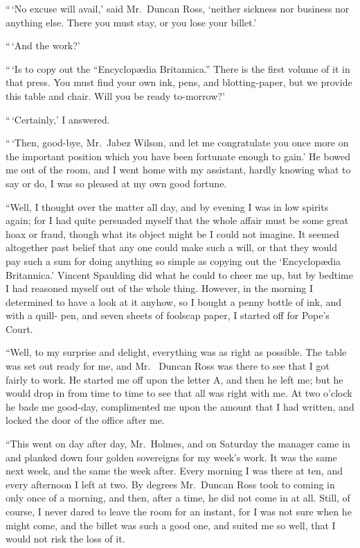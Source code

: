 “\,‘No excuse will avail,’ said Mr.~Duncan Ross, ‘neither
sickness nor business nor anything else. There you must
stay, or you lose your billet.’

“\,‘And the work?’

“\,‘Is to copy out the “Encyclopædia Britannica.” There
is the first volume of it in that press. You must find your
own ink, pens, and blotting-paper, but we provide this table
and chair. Will you be ready to-morrow?’

“\,‘Certainly,’ I answered.

“\,‘Then, good-bye, Mr.~Jabez Wilson, and let me congratulate
you once more on the important position which you
have been fortunate enough to gain.’ He bowed me out of
the room, and I went home with my assistant, hardly knowing
what to say or do, I was so pleased at my own good
fortune.

“Well, I thought over the matter all day, and by evening I
was in low spirits again; for I had quite persuaded myself
that the whole affair must be some great hoax or fraud,
though what its object might be I could not imagine. It
seemed altogether past belief that any one could make such
a will, or that they would pay such a sum for doing anything
so simple as copying out the ‘Encyclopædia Britannica.’
Vincent Spaulding did what he could to cheer me up, but by
bedtime I had reasoned myself out of the whole thing.
However, in the morning I determined to have a look at it
anyhow, so I bought a penny bottle of ink, and with a quill-%
pen, and seven sheets of foolscap paper, I started off for
Pope’s Court.

“Well, to my surprise and delight, everything was as right
as possible. The table was set out ready for me, and Mr.\ %
Duncan Ross was there to see that I got fairly to work. He
started me off upon the letter A, and then he left me; but he
would drop in from time to time to see that all was right with
me. At two o’clock he bade me good-day, complimented me
upon the amount that I had written, and locked the door of
the office after me.

“This went on day after day, Mr.~Holmes, and on Saturday
the manager came in and planked down four golden sovereigns
for my week’s work. It was the same next week, and
the same the week after. Every morning I was there at ten,
and every afternoon I left at two. By degrees Mr.~Duncan
Ross took to coming in only once of a morning, and then, after
a time, he did not come in at all. Still, of course, I never
dared to leave the room for an instant, for I was not sure
when he might come, and the billet was such a good one,
and suited me so well, that I would not risk the loss of it.


